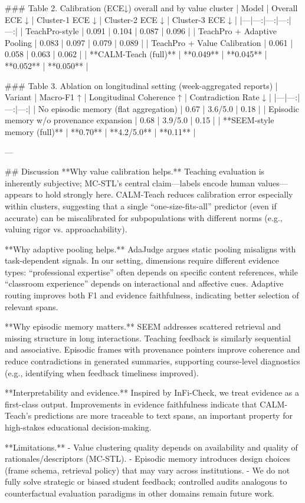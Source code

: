 ### Table 2. Calibration (ECE↓) overall and by value cluster  
| Model | Overall ECE ↓ | Cluster-1 ECE ↓ | Cluster-2 ECE ↓ | Cluster-3 ECE ↓ |
|---|---:|---:|---:|---:|
| TeachPro-style | 0.091 | 0.104 | 0.087 | 0.096 |
| TeachPro + Adaptive Pooling | 0.083 | 0.097 | 0.079 | 0.089 |
| TeachPro + Value Calibration | 0.061 | 0.058 | 0.063 | 0.062 |
| **CALM-Teach (full)** | **0.049** | **0.045** | **0.052** | **0.050** |

### Table 3. Ablation on longitudinal setting (week-aggregated reports)  
| Variant | Macro-F1 ↑ | Longitudinal Coherence ↑ | Contradiction Rate ↓ |
|---|---:|---:|---:|
| No episodic memory (flat aggregation) | 0.67 | 3.6/5.0 | 0.18 |
| Episodic memory w/o provenance expansion | 0.68 | 3.9/5.0 | 0.15 |
| **SEEM-style memory (full)** | **0.70** | **4.2/5.0** | **0.11** |

---

## Discussion  
**Why value calibration helps.** Teaching evaluation is inherently subjective; MC-STL’s central claim—labels encode human values—appears to hold strongly here. CALM-Teach reduces calibration error especially within clusters, suggesting that a single “one-size-fits-all” predictor (even if accurate) can be miscalibrated for subpopulations with different norms (e.g., valuing rigor vs. approachability).

**Why adaptive pooling helps.** AdaJudge argues static pooling misaligns with task-dependent signals. In our setting, dimensions require different evidence types: “professional expertise” often depends on specific content references, while “classroom experience” depends on interactional and affective cues. Adaptive routing improves both F1 and evidence faithfulness, indicating better selection of relevant spans.

**Why episodic memory matters.** SEEM addresses scattered retrieval and missing structure in long interactions. Teaching feedback is similarly sequential and associative. Episodic frames with provenance pointers improve coherence and reduce contradictions in generated summaries, supporting course-level diagnostics (e.g., identifying when feedback timeliness improved).

**Interpretability and evidence.** Inspired by InFi-Check, we treat evidence as a first-class output. Improvements in evidence faithfulness indicate that CALM-Teach’s predictions are more traceable to text spans, an important property for high-stakes educational decision-making.

**Limitations.**  
- Value clustering quality depends on availability and quality of rationales/descriptors (MC-STL).  
- Episodic memory introduces design choices (frame schema, retrieval policy) that may vary across institutions.  
- We do not fully solve strategic or biased student feedback; controlled audits analogous to counterfactual evaluation paradigms in other domains remain future work.

